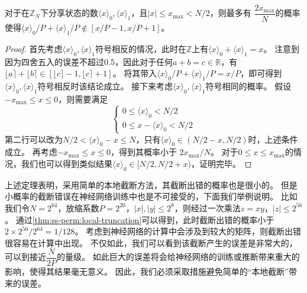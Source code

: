 \begin{theorem}[本地截断]
\label{thm:ss-perm:local-truncation}
    对于在$\mathbb Z_N$下分享状态的数$\langle x \rangle_0, \langle x \rangle_1$，且$|x| \le x_\text{max} < N/2$，则最多有
    $\dfrac{2x_\text{max}}{N}$的概率使得$\langle x \rangle_0/P + \langle x \rangle_1/P\notin [x/P - 1, x/P + 1]$。
\end{theorem}
\begin{proof}
    首先考虑$\langle x \rangle_0, \langle x \rangle_1$符号相反的情况，此时在$\mathbb Z$上有$\langle x \rangle_0 + \langle x \rangle_1 = x$。
    注意到因为四舍五入的误差不超过0.5，因此对于任何$a + b = c \in \mathbb R$，有$\lfloor a \rceil + \lfloor b \rceil \in [\lfloor c \rceil - 1, \lfloor c \rceil + 1]$。
    将其带入$\langle x \rangle_0/P + \langle x \rangle_1/P = x/P$，即可得到$\langle x \rangle_0, \langle x \rangle_1$符号相反时该结论成立。
    接下来考虑$\langle x \rangle_0, \langle x \rangle_1$符号相同的概率。
    假设$-x_\text{max} \le x \le 0$，则需要满足 
    \begin{equation}
    \begin{cases}
        0 \le \langle x \rangle_0 < N/2 \\
        0 \le x - \langle x \rangle_0 < N/2
    \end{cases}
    \end{equation}
    第二行可以改为$N/2 < \langle x \rangle_0 - x \le N$，只有$\langle x \rangle_0 \in (N/2 - x, N/2)$时，上述条件成立。
    再考虑$-x_\text{max} \le x \le 0$，得到其概率小于 $2x_\text{max}/N$。
    对于$0 \le x \le x_\text{max}$的情况，我们也可以得到类似结果$\langle x \rangle_0 \in [N/2, N/2 + x)$，证明完毕。
\end{proof}
%
上述定理表明，采用简单的本地截断方法，其截断出错的概率也是很小的。
%
但是小概率的截断错误在神经网络训练中也是不可接受的，下面我们举例说明。
%
比如我们令$N = 2^{64}$，放缩系数$P = 2^{20}$，$|x|, |y| \le 2^{8}$，则经过一次乘法$z = xy$，$|z| \le 2^{56}$。
%
通过\autoref{thm:ss-perm:local-truncation}可以得到，此时截断出错的概率小于$2 \times 2^{56} / 2^{64} = 1/128$。
%
考虑到神经网络的计算中会涉及到较大的矩阵，则截断出错很容易在计算中出现。
%
不仅如此，我们可以看到该截断产生的误差是非常大的，可以到接近$\dfrac{N}{2P}$的量级。
%
如此巨大的误差将会给神经网络的训练或推断带来重大的影响，使得其结果毫无意义。
%
因此，我们必须采取措施避免简单的“本地截断”带来的误差。


